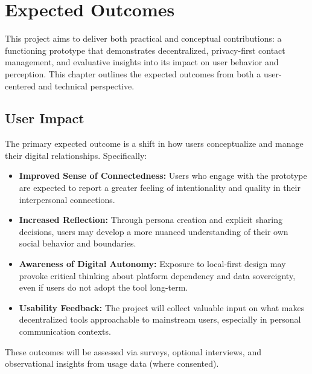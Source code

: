 \documentclass{imc-inf}
\begin{document}
\chapter{Expected Outcomes}

This project aims to deliver both practical and conceptual contributions: a functioning prototype that demonstrates decentralized, privacy-first contact management, and evaluative insights into its impact on user behavior and perception. This chapter outlines the expected outcomes from both a user-centered and technical perspective.

\section{User Impact}

The primary expected outcome is a shift in how users conceptualize and manage their digital relationships. Specifically:

\begin{itemize}
  \item \textbf{Improved Sense of Connectedness:} Users who engage with the prototype are expected to report a greater feeling of intentionality and quality in their interpersonal connections.
  \item \textbf{Increased Reflection:} Through persona creation and explicit sharing decisions, users may develop a more nuanced understanding of their own social behavior and boundaries.
  \item \textbf{Awareness of Digital Autonomy:} Exposure to local-first design may provoke critical thinking about platform dependency and data sovereignty, even if users do not adopt the tool long-term.
  \item \textbf{Usability Feedback:} The project will collect valuable input on what makes decentralized tools approachable to mainstream users, especially in personal communication contexts.
\end{itemize}

These outcomes will be assessed via surveys, optional interviews, and observational insights from usage data (where consented).
\end{document}
